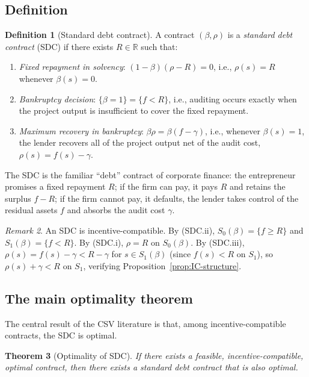 \documentclass[11pt,a4paper,oneside]{book}
\def\R{\mathbb{R}}
\def\geq{\geqslant}
\theoremstyle{plain}
\newtheorem{theorem}{Theorem}[chapter]
\theoremstyle{definition}
\newtheorem{definition}[theorem]{Definition}
\theoremstyle{remark}
\newtheorem{remark}[theorem]{Remark}
\numberwithin{equation}{chapter}
\begin{document}
\subsection{Definition}

\begin{definition}[Standard debt contract]\label{def:SDC}
A contract $(\beta, \rho)$ is a \emph{standard debt contract} (SDC) if there exists $R \in \R$ such that:
\begin{enumerate}
  \item[\textup{(SDC.i)}] \emph{Fixed repayment in solvency}: $(1 - \beta)(\rho - R) = 0$, i.e., $\rho(s) = R$ whenever $\beta(s) = 0$.
  \item[\textup{(SDC.ii)}] \emph{Bankruptcy decision}: $\{ \beta = 1 \} = \{ f < R \}$, i.e., auditing occurs exactly when the project output is insufficient to cover the fixed repayment.
  \item[\textup{(SDC.iii)}] \emph{Maximum recovery in bankruptcy}: $\beta \rho = \beta (f - \gamma)$, i.e., whenever $\beta(s) = 1$, the lender recovers all of the project output net of the audit cost, $\rho(s) = f(s) - \gamma$.
\end{enumerate}
\end{definition}

The SDC is the familiar ``debt'' contract of corporate finance: the entrepreneur promises a fixed repayment $R$; if the firm can pay, it pays $R$ and retains the surplus $f - R$; if the firm cannot pay, it defaults, the lender takes control of the residual assets $f$ and absorbs the audit cost $\gamma$.

\begin{remark}\label{rem:SDC-IC}
An SDC is incentive-compatible.
By (SDC.ii), $S_0(\beta) = \{ f \geq R \}$ and $S_1(\beta) = \{ f < R \}$.
By (SDC.i), $\rho = R$ on $S_0(\beta)$.
By (SDC.iii), $\rho(s) = f(s) - \gamma < R - \gamma$ for $s \in S_1(\beta)$ (since $f(s) < R$ on $S_1$), so $\rho(s) + \gamma < R$ on $S_1$, verifying Proposition~\ref{prop:IC-structure}.
\end{remark}

\subsection{The main optimality theorem}

The central result of the CSV literature is that, among incentive-compatible contracts, the SDC is optimal.

\begin{theorem}[Optimality of SDC]\label{thm:GH-optimality}
If there exists a feasible, incentive-compatible, optimal contract, then there exists a standard debt contract that is also optimal.
\end{theorem}
\end{document}
